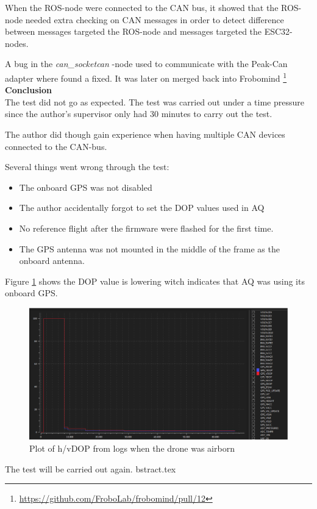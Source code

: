 When the ROS-node were connected to the CAN bus, it showed that the ROS-node needed extra checking on CAN messages in order to detect difference between messages targeted the ROS-node and messages targeted the ESC32-nodes.


A bug in the \textit{can\_socketcan} -node used to communicate with the Peak-Can adapter where found a fixed. It was later on merged back into Frobomind \footnote{\url{https://github.com/FroboLab/frobomind/pull/12}}
\textbf{Conclusion} \\

The test did not go as expected. The test was carried out under a time pressure since the author's supervisor only had 30 minutes to carry out the test.

The author did though gain experience when having multiple CAN devices connected to the CAN-bus.

Several things went wrong through the test:
\begin{itemize}
	\item The onboard GPS was not disabled
	\item The author accidentally forgot to set the DOP values used in AQ
	\item No reference flight after the firmware were flashed for the first time.
	\item The GPS antenna was not mounted in the middle of the frame as the onboard antenna.
\end{itemize}

Figure \ref{fig:qground_station_dop} shows the DOP value is lowering witch indicates that AQ was using its onboard GPS.

\begin{figure}[H]
    \center
    \includegraphics[width=1\textwidth]{graphics/test_qground_station_dop.eps}
  \caption{Plot of h/vDOP from logs when the drone was airborn}
    \label{fig:qground_station_dop}
\end{figure}

The test will be carried out again.
bstract.tex
